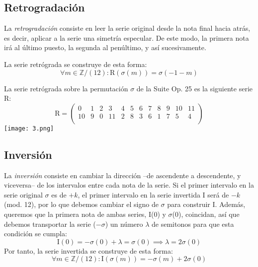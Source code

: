 	\subsection{Retrogradación}
		La \emph{retrogradación} consiste en leer la serie original desde la nota final hacia atrás, es decir, aplicar a la serie una simetría especular. De este modo, la primera nota irá al último puesto, la segunda al penúltimo, y así sucesivamente.
		
		La serie retrógrada se construye de esta forma:
		\[
		\forall m\in \mathbb{Z} / (12):	\text{R}\left(\sigma\left(m\right)\right)=\sigma\left(-1-m\right)\] 
			
		La serie retrógrada sobre la permutación $\sigma$ de la Suite Op. 25 es la siguiente serie R:	
		\[\text{R}=\left(\begin{matrix}0&1&2&3&4&5&6&7&8&9&10&11\\10&9&0&11&2&8&3&6&1&7&5&4\\\end{matrix}\right)\]		
		\texttt{[image: 3.png]}
		
	\subsection{Inversión}
		La \emph{inversión} consiste en cambiar la dirección --de ascendente a descendente, y viceversa-- de los intervalos entre cada nota de la serie. Si el primer intervalo en la serie original $\sigma$ es de $+k$, el primer intervalo en la serie invertida I será de $-k$ (mod. 12), por lo que debemos cambiar el signo de $\sigma$ para construir I. Además, queremos que la primera nota de ambas series, I(0) y $\sigma$(0), coincidan, así que debemos transportar la serie ($-\sigma$) un número $\lambda$ de semitonos para que esta condición se cumpla:
		\[\text{I}(0)=-\sigma\left(0\right)+\lambda=\sigma\left(0\right)\implies \lambda=2\sigma(0)\]
		Por tanto, la serie invertida se construye de esta forma:
		\[
		\forall m\in \mathbb{Z} / (12):	\text{I}\left(\sigma\left(m\right)\right)=-\sigma\left(m\right)+2\sigma\left(0\right)
		\]
		
